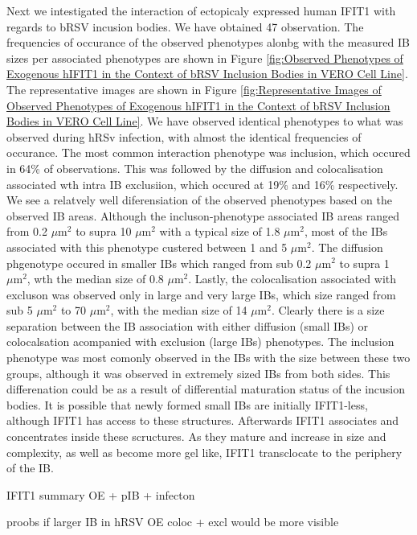 Next we intestigated the interaction of ectopicaly expressed human IFIT1 with regards to bRSV incusion bodies. We have obtained 47 observation. The frequencies of occurance of the observed phenotypes alonbg with the measured IB sizes per associated phenotypes are shown in Figure \ref{fig:Observed Phenotypes of Exogenous hIFIT1 in the Context of bRSV Inclusion Bodies in VERO Cell Line}. The representative images are shown in Figure \ref{fig:Representative Images of Observed Phenotypes of Exogenous hIFIT1 in the Context of bRSV Inclusion Bodies in VERO Cell Line}. We have observed identical phenotypes to what was observed during hRSv infection, with almost the identical frequencies of occurance. The most common interaction phenotype was inclusion, which occured in 64\% of observations. This was followed by the diffusion and colocalisation associated wth intra IB exclusiion, which occured at 19\% and 16\% respectively. We see a relatvely well diferensiation of the observed phenotypes based on the observed IB areas. Although the incluson-phenotype associated IB areas ranged from 0.2 \(\mu \mbox{m}^2\) to supra 10 \(\mu \mbox{m}^2\) with a typical size of 1.8 \(\mu \mbox{m}^2\), most of the IBs associated with this phenotype custered between 1 and 5 \(\mu \mbox{m}^2\). The diffusion phgenotype occured in smaller IBs which ranged from sub 0.2 \(\mu \mbox{m}^2\) to supra 1 \(\mu \mbox{m}^2\), wth the median size of 0.8 \(\mu \mbox{m}^2\). Lastly, the colocalisation associated with excluson was observed only in large and very large IBs, which size ranged from sub 5 \(\mu \mbox{m}^2\) to 70 \(\mu \mbox{m}^2\), with the median size of 14 \(\mu \mbox{m}^2\). Clearly there is a size separation between the IB association with either diffusion (small IBs) or colocalsation acompanied with exclusion (large IBs) phenotypes. The inclusion phenotype was most comonly observed in the IBs with the size between these two groups, although it was observed in extremely sized IBs from both sides. This differenation could be as a result of differential maturation status of the incusion bodies. It is possible that newly formed small IBs are initially IFIT1-less, although IFIT1 has access to these structures. Afterwards IFIT1 associates and concentrates inside these scructures. As they mature and increase in size and complexity, as well as become more gel like, IFIT1 transclocate to the periphery of the IB.

IFIT1 summary OE + pIB + infecton

proobs if larger IB in hRSV OE coloc + excl would be more visible


